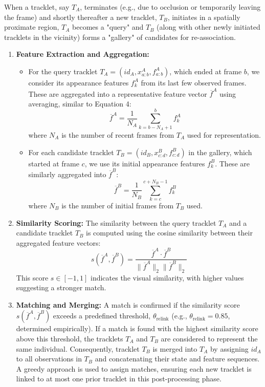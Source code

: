 \documentclass[12pt, a4paper]{article}
\begin{document}
When a tracklet, say $T_{A}$, terminates (e.g., due to occlusion or temporarily leaving the frame) and shortly thereafter a new tracklet, $T_{B}$, initiates in a spatially proximate region, $T_{A}$ becomes a "query" and $T_{B}$ (along with other newly initiated tracklets in the vicinity) forms a "gallery" of candidates for re-association.

\begin{enumerate}
    \item \textbf{Feature Extraction and Aggregation:}
    \begin{itemize}
        \item For the query tracklet $T_{A}=(id_{A}, x_{a:b}^{A}, f_{a:b}^{A})$, which ended at frame $b$, we consider its appearance features $f_{k}^{A}$ from its last few observed frames. These are aggregated into a representative feature vector $\overline{f}^{A}$ using averaging, similar to Equation 4:
        $$ \overline{f}^{A} = \frac{1}{N_A} \sum_{k=b-N_A+1}^{b} f_{k}^{A} $$
        where $N_A$ is the number of recent frames from $T_A$ used for representation.

        \item For each candidate tracklet $T_{B}=(id_{B}, x_{c:d}^{B}, f_{c:d}^{B})$ in the gallery, which started at frame $c$, we use its initial appearance features $f_{k}^{B}$. These are similarly aggregated into $\overline{f}^{B}$:
        $$ \overline{f}^{B} = \frac{1}{N_B} \sum_{k=c}^{c+N_B-1} f_{k}^{B} $$
        where $N_B$ is the number of initial frames from $T_B$ used.
    \end{itemize}

    \item \textbf{Similarity Scoring:}
    The similarity between the query tracklet $T_A$ and a candidate tracklet $T_B$ is computed using the cosine similarity between their aggregated feature vectors:
    $$ s(\overline{f}^{A}, \overline{f}^{B}) = \frac{\overline{f}^{A} \cdot \overline{f}^{B}}{\|\overline{f}^{A}\|_{2} \|\overline{f}^{B}\|_{2}} $$
    This score $s \in [-1, 1]$ indicates the visual similarity, with higher values suggesting a stronger match.

    \item \textbf{Matching and Merging:}
    A match is confirmed if the similarity score $s(\overline{f}^{A}, \overline{f}^{B})$ exceeds a predefined threshold, $\theta_{\text{relink}}$ (e.g., $\theta_{\text{relink}} = 0.85$, determined empirically). If a match is found with the highest similarity score above this threshold, the tracklets $T_A$ and $T_B$ are considered to represent the same individual. Consequently, tracklet $T_B$ is merged into $T_A$ by assigning $id_A$ to all observations in $T_B$ and concatenating their state and feature sequences. A greedy approach is used to assign matches, ensuring each new tracklet is linked to at most one prior tracklet in this post-processing phase.
\end{enumerate}
\end{document}
